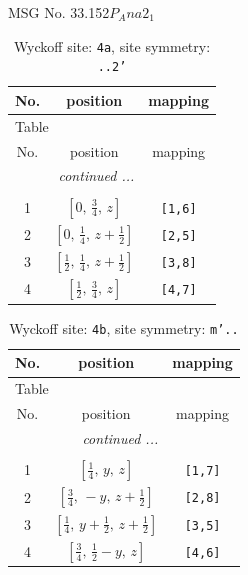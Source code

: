 \documentclass[fleqn,8pt]{jsarticle}
\begin{document}
\setcounter{MaxMatrixCols}{32}

\renewcommand{\tablename}{Table~}
\renewcommand{\figurename}{Figure~}
\begin{center}
\LARGE
MSG No. 33.152\quad$P_{A}na2_{1}$
\end{center}
\renewcommand{\arraystretch}{1.2}
\begin{longtable}{ccc}
\caption{Wyckoff site: {\tt 4a}, site symmetry: {\tt ..2'}}
 \\
 \hline \hline
No. & position & mapping \\ \hline \endfirsthead

\multicolumn{2}{l}{\tablename\ \thetable{}} \\
 \hline \hline
No. & position & mapping \\ \hline \endhead

 \hline \hline
\multicolumn{2}{r}{\footnotesize\it continued ...} \\ \endfoot

 \hline \hline
\multicolumn{2}{r}{} \\ \endlastfoot

1 & $\left[ 0,\, \frac{3}{4},\, z \right]$ & {\tt [1,6]} \\ \hline
2 & $\left[ 0,\, \frac{1}{4},\, z + \frac{1}{2} \right]$ & {\tt [2,5]} \\ \hline
3 & $\left[ \frac{1}{2},\, \frac{1}{4},\, z + \frac{1}{2} \right]$ & {\tt [3,8]} \\ \hline
4 & $\left[ \frac{1}{2},\, \frac{3}{4},\, z \right]$ & {\tt [4,7]} \\
\end{longtable}
\renewcommand{\arraystretch}{1.2}
\begin{longtable}{ccc}
\caption{Wyckoff site: {\tt 4b}, site symmetry: {\tt m'..}}
 \\
 \hline \hline
No. & position & mapping \\ \hline \endfirsthead

\multicolumn{2}{l}{\tablename\ \thetable{}} \\
 \hline \hline
No. & position & mapping \\ \hline \endhead

 \hline \hline
\multicolumn{2}{r}{\footnotesize\it continued ...} \\ \endfoot

 \hline \hline
\multicolumn{2}{r}{} \\ \endlastfoot

1 & $\left[ \frac{1}{4},\, y,\, z \right]$ & {\tt [1,7]} \\ \hline
2 & $\left[ \frac{3}{4},\, - y,\, z + \frac{1}{2} \right]$ & {\tt [2,8]} \\ \hline
3 & $\left[ \frac{1}{4},\, y + \frac{1}{2},\, z + \frac{1}{2} \right]$ & {\tt [3,5]} \\ \hline
4 & $\left[ \frac{3}{4},\, \frac{1}{2} - y,\, z \right]$ & {\tt [4,6]} \\
\end{longtable}
\end{document}
